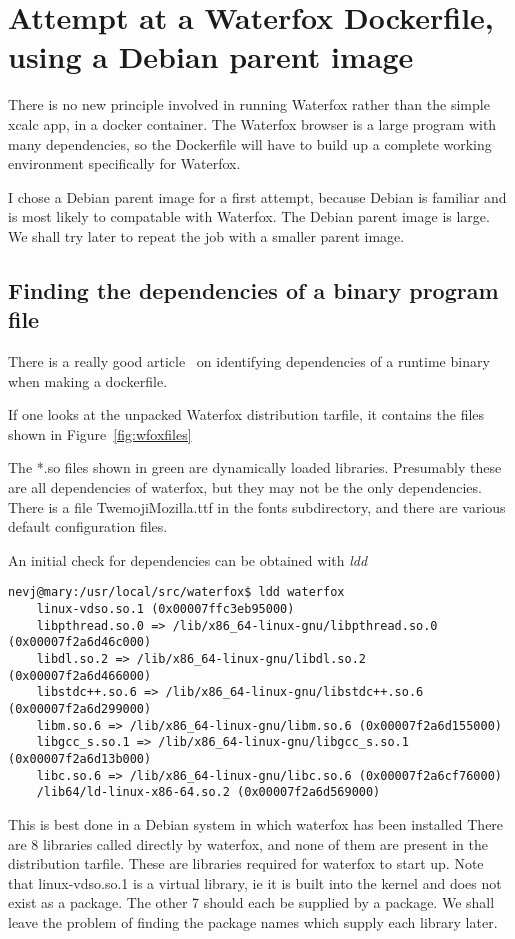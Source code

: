 \documentclass{article}  %
\begin{document}
\section{Attempt at a Waterfox Dockerfile, using a  Debian parent image}
There is no new principle involved in running Waterfox rather than the simple xcalc app, in a docker container. The Waterfox browser is a large program with many dependencies, so the Dockerfile will have to build up a complete working environment specifically for Waterfox. 

I chose a Debian parent image for a first attempt, because Debian is familiar and is most likely to compatable with Waterfox.  The Debian parent image is large. We shall try later to repeat the job with a smaller parent image. 

\subsection{Finding the dependencies of a binary program file}
There is a really good article~\cite{rehn:21} on identifying dependencies of a runtime binary when making a dockerfile.

If one looks at the unpacked Waterfox distribution tarfile, it contains the files shown in Figure~\ref{fig:wfoxfiles}

The *.so files shown in green are dynamically loaded libraries. Presumably these are all dependencies of waterfox, but they may not be the only dependencies. There is a file TwemojiMozilla.ttf in the fonts subdirectory, and there are various default configuration files.

An initial check for dependencies can be obtained with {\em ldd}
\begin{verbatim}
nevj@mary:/usr/local/src/waterfox$ ldd waterfox
	linux-vdso.so.1 (0x00007ffc3eb95000)
	libpthread.so.0 => /lib/x86_64-linux-gnu/libpthread.so.0 (0x00007f2a6d46c000)
	libdl.so.2 => /lib/x86_64-linux-gnu/libdl.so.2 (0x00007f2a6d466000)
	libstdc++.so.6 => /lib/x86_64-linux-gnu/libstdc++.so.6 (0x00007f2a6d299000)
	libm.so.6 => /lib/x86_64-linux-gnu/libm.so.6 (0x00007f2a6d155000)
	libgcc_s.so.1 => /lib/x86_64-linux-gnu/libgcc_s.so.1 (0x00007f2a6d13b000)
	libc.so.6 => /lib/x86_64-linux-gnu/libc.so.6 (0x00007f2a6cf76000)
	/lib64/ld-linux-x86-64.so.2 (0x00007f2a6d569000)
\end{verbatim}
This is best done in a Debian system in which waterfox has been installed
There are 8 libraries called directly by waterfox, and none of them are present in the distribution tarfile. These are libraries required for waterfox to start up. Note that linux-vdso.so.1 is a virtual library, ie it is built into the kernel and does not exist as a package. The other 7 should each be supplied by a package. We shall leave the problem of finding the package names which supply each library later.
\end{document}
